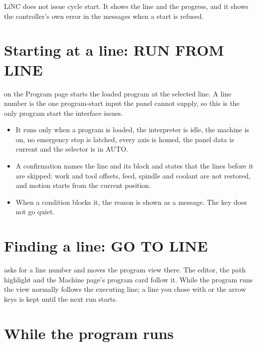 LiNC does not issue cycle start. It shows the line and the progress, and it shows the
controller's own error in the messages when a start is refused.

\section{Starting at a line: RUN FROM LINE}

 on the Program page starts the loaded program at the selected line.
A line number is the one program-start input the panel cannot supply, so this is the only
program start the interface issues.

\begin{itemize}
  \item It runs only when a program is loaded, the interpreter is idle, the machine is on, no
        emergency stop is latched, every axis is homed, the panel data is current and the
        selector is in AUTO.
  \item A confirmation names the line and its block and states that the lines before it are
        skipped: work and tool offsets, feed, spindle and coolant are not restored, and
        motion starts from the current position.
  \item When a condition blocks it, the reason is shown as a message. The key does not go
        quiet.
\end{itemize}

\section{Finding a line: GO TO LINE}

 asks for a line number and moves the program view there. The editor,
the path highlight and the Machine page's program card follow it. While the program runs the
view normally follows the executing line; a line you chose with  or
the arrow keys is kept until the next run starts.

\section{While the program runs}

